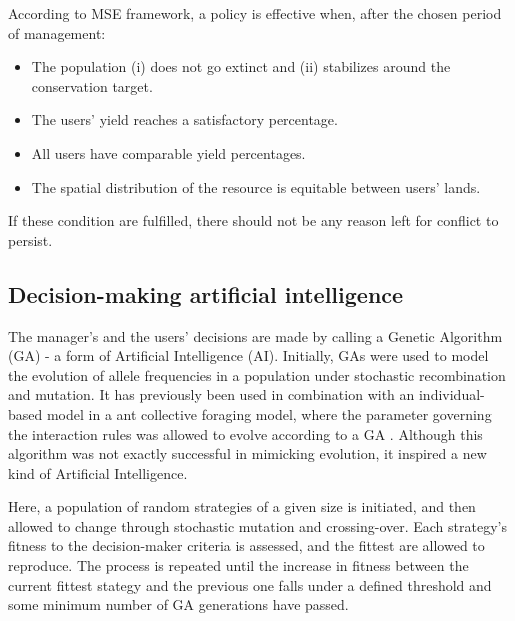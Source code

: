 \documentclass[12pt,a4paper]{article}
\begin{document}
According to MSE framework, a policy is effective when, after the chosen period of management: %
\begin{itemize}
    \item The population (i) does not go extinct and (ii) stabilizes around the conservation target.
    \item The users' yield reaches a satisfactory percentage.
    \item All users have comparable yield percentages.
    \item The spatial distribution of the resource is equitable between users' lands.
\end{itemize}
If these condition are fulfilled, there should not be any reason left for conflict to persist.

\subsection{Decision-making artificial intelligence}

The manager's and the users' decisions are made by calling a Genetic Algorithm (GA) - a form of Artificial Intelligence (AI).
Initially, GAs were used to model the evolution of allele frequencies in a population under stochastic recombination and mutation. %
It has previously been used in combination with an individual-based model in a ant collective foraging model, where the parameter governing the interaction rules was allowed to evolve according to a GA \citep{hamblin2013practical}. %
Although this algorithm was not exactly successful in mimicking evolution, it inspired a new kind of Artificial Intelligence.

Here, a population of random strategies of a given size is initiated, and then allowed to change through stochastic mutation and crossing-over. 
Each strategy's fitness to the decision-maker criteria is assessed, and the fittest are allowed to reproduce.
The process is repeated until the increase in fitness between the current fittest stategy and the previous one falls under a defined threshold and some minimum number of GA generations have passed.
\end{document}
